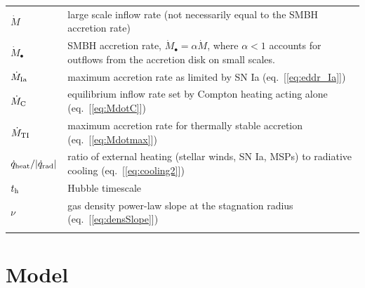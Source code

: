 \documentclass[usenatbib,fleqn]{mn2e}
\begin{document}
\begin{table}
\begin{threeparttable}
\begin{minipage}{18cm}
\begin{tabular}{ll}
  $\dot{M}$ & large scale inflow rate (not necessarily equal to the SMBH accretion rate)   \\
  $\dot{M}_{\bullet}$ & SMBH accretion rate, $\dot{M}_{\bullet} = \alpha\dot{M}$, where $\alpha < 1$ accounts for outflows from the accretion disk on small scales.   \\
  $\dot{M}_{\rm Ia}$ & maximum accretion rate as limited by SN Ia (eq.~[\ref{eq:eddr_Ia}]) \\
  $\dot{M}_{\rm C}$ & equilibrium inflow rate set by Compton heating acting alone (eq.~[\ref{eq:MdotC}]) \\
  $\dot{M}_{\rm TI}$ & maximum accretion rate for thermally stable accretion (eq.~[\ref{eq:Mdotmax}]) \\
  $\dot{q}_{\rm heat}/|\dot{q}_{\rm rad}|$ & ratio of external heating (stellar winds, SN Ia, MSPs) to radiative cooling (eq.~[\ref{eq:cooling2}]) \\
  $t_{\rm h}$ & Hubble timescale \\
  $\nu$ & gas density power-law slope at the stagnation radius
  (eq.~[\ref{eq:densSlope}]) \\
  \hline
\label{table:definitions}  
\end{tabular}
\end{minipage}
\end{threeparttable}

\end{table}


\section{Model}
\label{sec:model}
\end{document}

